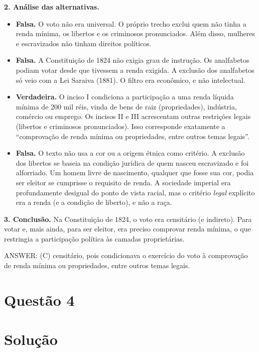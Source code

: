 \documentclass{article}%
\begin{document}
\textbf{2. Análise das alternativas.}
\begin{itemize}
\item[a)] \textbf{Falsa.} O voto não era universal. O próprio trecho exclui quem não tinha a renda mínima, os libertos e os criminosos pronunciados. Além disso, mulheres e escravizados não tinham direitos políticos.
\item[b)] \textbf{Falsa.} A Constituição de 1824 não exigia grau de instrução. Os analfabetos podiam votar desde que tivessem a renda exigida. A exclusão dos analfabetos só veio com a Lei Saraiva (1881). O filtro era econômico, e não intelectual.
\item[c)] \textbf{Verdadeira.} O inciso I condiciona a participação a uma renda líquida mínima de 200 mil réis, vinda de bens de raiz (propriedades), indústria, comércio ou emprego. Os incisos II e III acrescentam outras restrições legais (libertos e criminosos pronunciados). Isso corresponde exatamente a ``comprovação de renda mínima ou propriedades, entre outros temas legais''.
\item[d)] \textbf{Falsa.} O texto não usa a cor ou a origem étnica como critério. A exclusão dos libertos se baseia na condição jurídica de quem nasceu escravizado e foi alforriado. Um homem livre de nascimento, qualquer que fosse sua cor, podia ser eleitor se cumprisse o requisito de renda. A sociedade imperial era profundamente desigual do ponto de vista racial, mas o critério \emph{legal} explícito era a renda (e a condição de liberto), e não a raça.
\end{itemize}

\textbf{3. Conclusão.} Na Constituição de 1824, o voto era censitário (e indireto). Para votar e, mais ainda, para ser eleitor, era preciso comprovar renda mínima, o que restringia a participação política às camadas proprietárias.

ANSWER: (C) censitário, pois condicionava o exercício do voto à comprovação de renda mínima ou propriedades, entre outros temas legais.%
\newpage%
\section*{Questão 4}

\section*{Solução}
\end{document}
